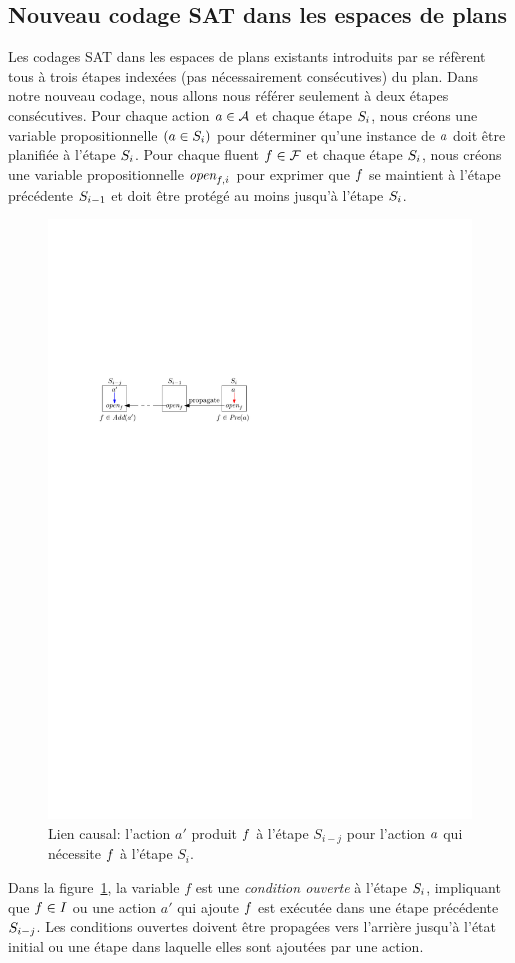 %
%
\subsection{Nouveau codage SAT dans les espaces de plans}\label{chap:codages:satqbf:satopen}


Les codages SAT dans les espaces de plans existants introduits par \cite{MK99} se réfèrent tous à trois étapes indexées (pas nécessairement consécutives) du plan.
Dans notre nouveau codage, nous allons nous référer seulement à deux étapes consécutives.
Pour chaque action $\a\in\A$ et chaque étape $\step{i}$, nous créons une variable propositionnelle $\instep{a}{i}$ pour déterminer qu'une instance de $\a$ doit être planifiée à l'étape $\step{i}$.
Pour chaque fluent $\f\in\F$ et chaque étape $\step{i}$, nous créons une variable propositionnelle $\open{\f}{i}$ pour exprimer que $\f$ se maintient à l'étape précédente $\step{i-1}$ et doit être protégé au moins jusqu'à l'étape $\step{i}$.

\begin{figure}[h!]\centering
	\includegraphics[width=.5\textwidth]{figures/transitions}
    \caption{Lien causal: l'action $a'$ produit $\f$ à l'étape $S_{i-j}$ pour l'action $\a$ qui nécessite $\f$ à l'étape $S_{i}$.}
    \label{fig:causal-link-sat}
\end{figure}

Dans la figure~\ref{fig:causal-link-sat}, la variable $f$ est une \textit {condition ouverte} à l'étape $\S_i$, impliquant que $\f\in\I$ ou une action $a'$ qui ajoute $\f$ est exécutée dans une étape précédente $\S_{i-j}$.
Les conditions ouvertes doivent être propagées vers l'arrière jusqu'à l'état initial ou une étape dans laquelle elles sont ajoutées par une action.




